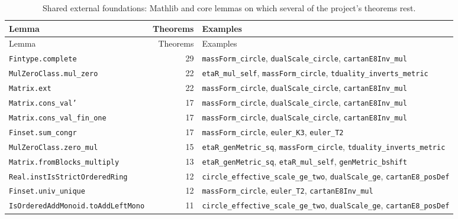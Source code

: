 \begin{longtable}{p{}rp{}}
\caption{Shared external foundations: Mathlib and core lemmas on which several of the project's theorems rest.}\label{tab:atlas-shared}\\
\toprule
Lemma & Theorems & Examples \\ \midrule \endfirsthead
\toprule
Lemma & Theorems & Examples \\ \midrule \endhead
\bottomrule \endfoot
\texttt{\scriptsize Fintype.complete} & 29 & \texttt{\small massForm\_circle}, \texttt{\small dualScale\_circle}, \texttt{\small cartanE8Inv\_mul} \\
\texttt{\scriptsize MulZeroClass.mul\_zero} & 22 & \texttt{\small etaR\_mul\_self}, \texttt{\small massForm\_circle}, \texttt{\small tduality\_inverts\_metric} \\
\texttt{\scriptsize Matrix.ext} & 22 & \texttt{\small massForm\_circle}, \texttt{\small dualScale\_circle}, \texttt{\small cartanE8Inv\_mul} \\
\texttt{\scriptsize Matrix.cons\_val'} & 17 & \texttt{\small massForm\_circle}, \texttt{\small dualScale\_circle}, \texttt{\small cartanE8Inv\_mul} \\
\texttt{\scriptsize Matrix.cons\_val\_fin\_one} & 17 & \texttt{\small massForm\_circle}, \texttt{\small dualScale\_circle}, \texttt{\small cartanE8Inv\_mul} \\
\texttt{\scriptsize Finset.sum\_congr} & 17 & \texttt{\small massForm\_circle}, \texttt{\small euler\_K3}, \texttt{\small euler\_T2} \\
\texttt{\scriptsize MulZeroClass.zero\_mul} & 15 & \texttt{\small etaR\_genMetric\_sq}, \texttt{\small massForm\_circle}, \texttt{\small tduality\_inverts\_metric} \\
\texttt{\scriptsize Matrix.fromBlocks\_multiply} & 13 & \texttt{\small etaR\_genMetric\_sq}, \texttt{\small etaR\_mul\_self}, \texttt{\small genMetric\_bshift} \\
\texttt{\scriptsize Real.instIsStrictOrderedRing} & 12 & \texttt{\small circle\_effective\_scale\_ge\_two}, \texttt{\small dualScale\_ge}, \texttt{\small cartanE8\_posDef} \\
\texttt{\scriptsize Finset.univ\_unique} & 12 & \texttt{\small massForm\_circle}, \texttt{\small euler\_T2}, \texttt{\small cartanE8Inv\_mul} \\
\texttt{\scriptsize IsOrderedAddMonoid.toAddLeftMono} & 11 & \texttt{\small circle\_effective\_scale\_ge\_two}, \texttt{\small dualScale\_ge}, \texttt{\small cartanE8\_posDef} \\

\end{longtable}
